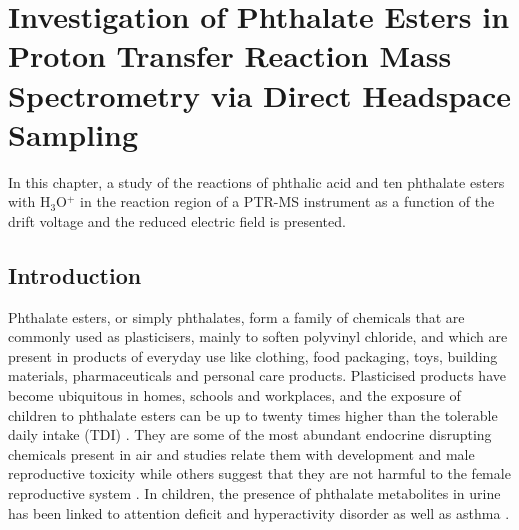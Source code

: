 \chapter{Investigation of Phthalate Esters in Proton Transfer Reaction Mass Spectrometry via Direct Headspace Sampling}








In this chapter, a study of the reactions of phthalic acid and ten phthalate esters with H$_3$O$^+$ in the reaction region of a PTR-MS instrument as a function of the drift voltage and the reduced electric field is presented.


\section{Introduction}

Phthalate esters, or simply phthalates, form a family of chemicals that are commonly used as plasticisers, mainly to soften polyvinyl chloride, and which are present in products of everyday use like clothing, food packaging, toys, building materials, pharmaceuticals and personal care products.  
%
Plasticised products have become ubiquitous in  homes, schools and workplaces, and the exposure of children to phthalate esters can be up to twenty times higher than the tolerable daily intake (\acrshort{TDI})
\cite{heudorf2007phthalates}.
%
They are some of the most abundant  endocrine disrupting chemicals %
present in air and studies relate them with development and male reproductive toxicity while others suggest that they are not harmful to the female reproductive system \cite{rudel2003phthalates,foster2000effects,benson2009hazard,matsumoto2008potential,kay2013reproductive}. 
%
In children, the presence of phthalate metabolites in urine has been linked to attention deficit and hyperactivity disorder as well as  asthma \cite{kim2009phthalates,bornehag2010phthalate}.








